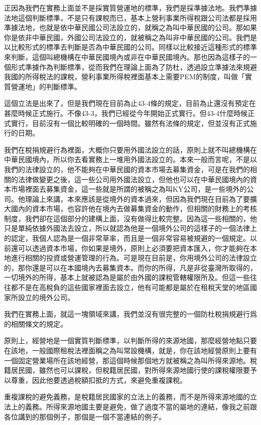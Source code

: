 \documentclass[]{ctexbook}
\begin{document}
正因為我們在實務上面並不是採實質營運地的標準，我們是採準據法地。我們準據法地這個判斷標準，不是只有課稅而已，基本上營利事業所得稅跟公司法都是採用準據法地，也就是依中華民國公司法設立的，就稱之為叫中華民國的公司。那如果你是依非中華民國，外國公司法設立的，就被稱之為叫非中華民國的公司。我們是以比較形式的標準去判斷是否為中華民國的公司。同樣以比較接近這種形式的標準來判斷，這個叫總機構在中華民國境內或非在中華民國境內。那也因為這樣子的一個形式準據作為判斷標準，從而我們在理論上面為了防杜，透過設立準據法來規避我國的所得稅法的課稅，營利事業所得稅裡面基本上需要PEM的制度，叫做「實質營運地」的判斷標準。

這個立法是出來了，但是我們現在目前為止43-4條的規定，目前為止還沒有預定在甚麼時候正式施行。不像43-3，我們已經從今年開始正式實行。但43-4什麼時候正式實行，目前沒有一個比較明確的一個時間。雖然有法條的規定，但並沒有正式施行的日期。

我們在稅捐規避行為裡面，大概你只要用外國法設立的話，原則上就不叫總機構在中華民國境內，所以你去看實務上一堆用外國法設立的。本來一般而言呢，不是以我們的法律設立的，他不能夠在中華民國的資本市場去募集資金，可是在我們的相關的法律做變更之後，這一些公司用外國法設立，但他也可以在中華民國境內的資本市場裡面去募集資金，這一些就是所謂的被稱之為叫KY公司，是一些境外的公司。他理論上來講，本來應該是從境外的資本過來，但因為我們現在目前為了要擴大國內的資本市場，也容許他在境內去做募集資金的動作，但相關的財務上的考核制度，我們卻在這個部分的建構上面，沒有做得比較完整。因為這一些相關的，他只是單純依據外國法去設立，所以就認為他是一個境外公司的這樣子的一個法律上的認定，我個人認為是一個非常草率，而且是一個非常容易被規避的一個規定。以前還可以透過資本市場，你如果是境外，原則上必須要把資本匯入，你才能夠在本地進行相關的投資或營運管理的行為。可是現在目前是，你用境外公司的法律設立的，那你還是可以在本國境內去募集資本。而你的所得，凡是非從臺灣所取得的，一切境外的所得，基本上就被認為是屬於由外國的課稅管轄權限所及。但這一些往往都不是在高稅負的這些國家裡面去設立，他有可能都是屬於在租稅天堂的地區國家所設立的境外公司。

我們在實務上面，就這一塊領域來講，我們並沒有很完整的一個防杜稅捐規避行爲的相關條文的規定。

原則上，經營地是一個實質判斷標準，以判斷所得的來源地國，那麼經營地點只要在該地，一般國際租稅法裡面稱之為叫常設機構，就是，你在該地經營原則上要有一個固定營業場所在該地經營，那這個時候那個地方就被稱之為叫所得來源地。稅籍居民國，雖然也可以課稅，但稅籍居民國，對所得來源地國行使的課稅權限要予以尊重，因此他要透過稅額扣抵的方式，來避免重複課稅。

重複課稅的避免義務，是稅籍居民國家的立法上的義務，而不是所得來源地國的立法上的義務。所得來源地國主要是避免，做了過度不當的屬地的連結，像我之前跟各位講到的那個例子，那個是一個不當連結的例子。
\end{document}
